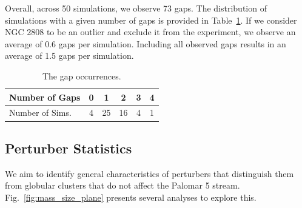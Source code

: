 \documentclass[draft]{aa}
\begin{document}
    Overall, across 50 simulations, we observe 73 gaps. The distribution of simulations with a given number of gaps is provided in Table~\ref{table:gap_distribution}.  If we consider NGC 2808 to be an outlier and exclude it from the experiment, we observe an average of 0.6 gaps per simulation. Including all observed gaps results in an average of 1.5 gaps per simulation.

    \begin{table}[h]
      \centering
        \begin{tabular}{|l|c|c|c|c|c|}
          \hline
          Number of Gaps & 0 & 1 & 2 & 3 & 4 \\
          \hline
          Number of Sims. & 4 & 25 & 16 & 4 & 1 \\
          \hline
        \end{tabular}
      \caption{The gap occurrences.}\label{table:gap_distribution}
    \end{table}
    


    

    



 
 \subsection*{Perturber Statistics}
  

    We aim to identify general characteristics of perturbers that distinguish them from globular clusters that do not affect the Palomar 5 stream. Fig.~\ref{fig:mass_size_plane} presents several analyses to explore this.
\end{document}
